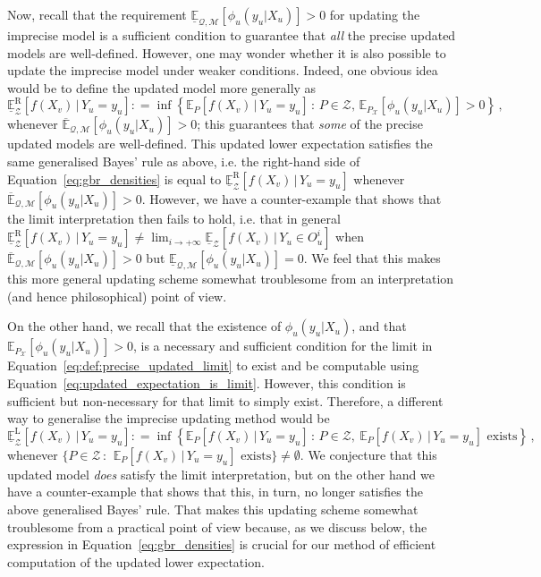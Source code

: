\documentclass[twoside,11pt]{article}
\newcommand{\states}{\mathcal{X}}
\newcommand{\lexp}{\underline{\mathbb{E}}_{\rateset,\mathcal{M}}}
\newcommand{\uexp}{\overline{\mathbb{E}}_{\rateset,\mathcal{M}}}
\newcommand{\rateset}{\mathcal{Q}}
\newcommand{\coloneqq}{:\!=}
\begin{document}
Now, recall that the requirement $\lexp[\phi_u(y_u\vert X_u)]>0$ for updating the imprecise model is a sufficient condition to guarantee that \emph{all} the precise updated models are well-defined. However, one may wonder whether it is also possible to update the imprecise model under weaker conditions. Indeed, one obvious idea would be to define the updated model more generally as
\begin{equation*}
\underline{\mathbb{E}}_\mathcal{Z}^\mathrm{R}[f(X_v)\,\vert\,Y_u=y_u] \coloneqq \inf\left\{ \mathbb{E}_P[f(X_v)\,\vert\,Y_u=y_u]\,:\, P\in\mathcal{Z},\,\mathbb{E}_{P_\states}[\phi_u(y_u\vert X_u)]>0 \right\}\,,
\end{equation*}
whenever $\uexp[\phi_u(y_u\vert X_u)]>0$; this guarantees that \emph{some} of the precise updated models are well-defined. This updated lower expectation satisfies the same generalised Bayes' rule as above, i.e. the right-hand side of Equation~\eqref{eq:gbr_densities} is equal to $\underline{\mathbb{E}}_\mathcal{Z}^\mathrm{R}[f(X_v)\,\vert\,Y_u=y_u]$ whenever $\uexp[\phi_u(y_u\vert X_u)]>0$. However, we have a counter-example that shows that the limit interpretation then fails to hold, i.e. that in general $\underline{\mathbb{E}}_\mathcal{Z}^\mathrm{R}[f(X_v)\,\vert\,Y_u=y_u] \neq \lim_{i\to+\infty} \underline{\mathbb{E}}_\mathcal{Z}[f(X_v)\,\vert\,Y_u\in O_u^i]$ when $\uexp[\phi_u(y_u\vert X_u)]>0$ but $\lexp[\phi_u(y_u\vert X_u)]=0$. We feel that this makes this more general updating scheme somewhat troublesome from an interpretation (and hence philosophical) point of view.

On the other hand, we recall that the existence of $\phi_u(y_u\vert X_u)$, and that $\mathbb{E}_{P_\states}[\phi_u(y_u\vert X_u)]>0$, is a necessary and sufficient condition for the limit in Equation~\eqref{eq:def:precise_updated_limit} to exist and be computable using Equation~\eqref{eq:updated_expectation_is_limit}. However, this condition is sufficient but non-necessary for that limit to simply exist. Therefore, a different way to generalise the imprecise updating method would be
\begin{equation*}
\underline{\mathbb{E}}_\mathcal{Z}^\mathrm{L}[f(X_v)\,\vert\,Y_u=y_u] \coloneqq \inf\left\{ \mathbb{E}_P[f(X_v)\,\vert\,Y_u=y_u]\,:\, P\in\mathcal{Z},~\text{$\mathbb{E}_P[f(X_v)\,\vert\,Y_u=y_u]$ exists} \right\}\,,
\end{equation*}
whenever $\{P\in\mathcal{Z}\,:\,~\text{$\mathbb{E}_P[f(X_v)\,\vert\,Y_u=y_u]$ exists}\}\neq\emptyset$. We conjecture that this updated model \emph{does} satisfy the limit interpretation, but on the other hand we have a counter-example that shows that this, in turn, no longer satisfies the above generalised Bayes' rule. That makes this updating scheme somewhat troublesome from a practical point of view because, as we discuss below, the expression in Equation~\eqref{eq:gbr_densities} is crucial for our method of efficient computation of the updated lower expectation.
\end{document}
